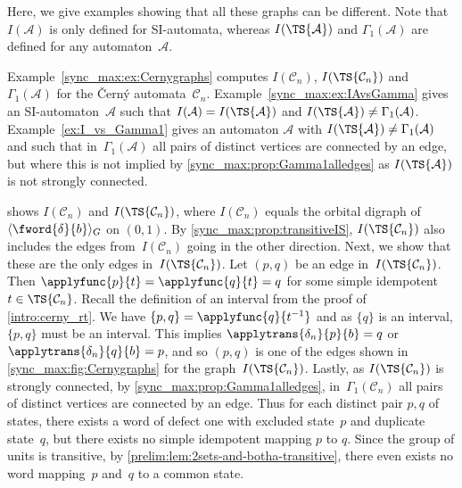 

Here,  we give examples showing that all these graphs can be different.
Note that $I(\mathcal A)$
is only defined for SI-automata, whereas $I(\TS{\mathcal A})$ and $\Gamma_1(\mathcal A)$
are defined for any automaton~$\mathcal A$.

Example~\ref{sync_max:ex:Cernygraphs} computes $I(\mathcal C_n)$,
$I(\TS{\mathcal C_n})$ and $\Gamma_1(\mathcal A)$ for the \v{C}ern\'y automata~$\mathcal C_n$.
Example~\ref{sync_max:ex:IAvsGamma}
gives an SI-automaton~$\mathcal A$
such that $I(\mathcal A) = I(\TS{\mathcal A})$
and $I(\TS{\mathcal A}) \ne \Gamma_1(\mathcal A)$.
Example~\ref{ex:I_vs_Gamma1} 
gives an automaton $\mathcal A$ with $I(\TS{\mathcal A}) \ne \Gamma_1(\mathcal A)$ and such that in~$\Gamma_1(\mathcal A)$ all pairs of distinct 
vertices are connected by an edge, but where this is not implied
by \cref{sync_max:prop:Gamma1alledges} as $I(\TS{\mathcal A})$
is not strongly connected. 

\begin{example}
	\label{sync_max:ex:Cernygraphs}
	 shows $I(\mathcal C_n)$ and $I(\TS{\mathcal C_n})$,
	where $I(\mathcal C_n)$ equals the orbital digraph of $\langle \fword{\delta}{b} \rangle_G$
	on $(0,1)$.	
	By \cref{sync_max:prop:transitiveIS}, $I(\TS{\mathcal C_n})$ also includes 
	the edges from~$I(\mathcal C_n)$
	going in the other direction.
	Next, we show that these are the only edges in~$I(\TS{\mathcal C_n})$.
	Let $(p,q)$ be an edge in~$I(\TS{\mathcal C_n})$.
	Then $\applyfunc{p}{t} = \applyfunc{q}{t} = q$ for some simple idempotent $t \in \TS{\mathcal C_n}$.
	Recall the definition of an interval from the  proof of \cref{intro:cerny_rt}.	
	We have $\{p,q\} = \applyfunc{q}{t^{-1}}$ 
	and as $\{q\}$ is an interval, $\{p,q\}$ must be an interval.
	This implies 
	$\applytrans{\delta_n}{p}{b} = q$
	or $\applytrans{\delta_n}{q}{b} = p$, and so $(p,q)$
	is one of the edges shown in \cref{sync_max:fig:Cernygraphs}
	for the graph~$I(\TS{\mathcal C_n})$.
	Lastly, as  $I(\TS{\mathcal C_n})$ is strongly connected, by \cref{sync_max:prop:Gamma1alledges}, 
	in~$\Gamma_1(\mathcal C_n)$ all pairs of distinct vertices are connected by an edge.
	Thus for each distinct pair $p,q$ of states, there exists a word of defect one
	with excluded state~$p$ and duplicate state~$q$,
	but there exists no simple idempotent mapping $p$ to $q$.
	Since the group of units is transitive,
	by \cref{prelim:lem:2sets-and-botha-transitive}, 
	there even exists no word mapping~$p$ and~$q$
	to a common state.
\end{example}

